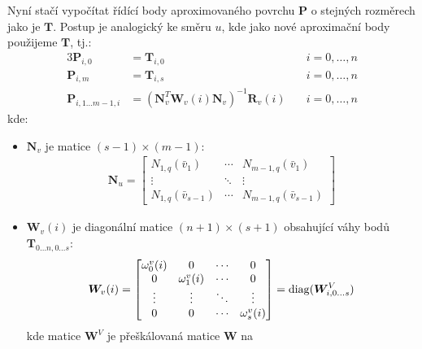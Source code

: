 Nyní stačí vypočítat řídící body aproximovaného povrchu $\bm{P}$ o stejných rozměrech
jako je $\bm{T}$.
Postup je analogický ke směru $u$, kde jako nové aproximační body použijeme
$\bm{T}$, tj.:
\begin{alignat}{3}
    \bm{P}_{i, 0}                 & = \bm{T}_{i, 0}                                   & \quad i = 0, \ldots, n \\
    \bm{P}_{i, m}                 & = \bm{T}_{i, s}                                   & \quad i = 0, \ldots, n \\
    \bm{P}_{i, 1 \ldots m - 1, i} & = (\bm{N}_v^T\bm{W}_v(i)\bm{N}_v)^{-1}\bm{R}_v(i) & \quad i = 0, \ldots, n
\end{alignat}
kde:
\begin{itemize}
    \item $\bm{N}_v$ je matice $(s - 1) \times (m - 1)$:
          \begin{align}
              \bm{N}_u =
              \begin{bmatrix}
                  N_{1,q}(\bar{v}_1)        & \cdots & N_{m-1,q}(\bar{v}_1)     \\
                  \vdots                    & \ddots & \vdots                   \\
                  N_{1, q}(\bar{v}_{s - 1}) & \cdots & N_{m-1,q}(\bar{v}_{s-1})
              \end{bmatrix}
          \end{align}
    \item $\bm{W}_v(i)$ je diagonální matice $(n + 1)\times(s + 1)$ obsahující váhy
          bodů $\bm{T}_{0\ldots n, 0\ldots s}$:
          \begin{align}
              \bm{W}_v(i)
              = \begin{bmatrix}
                    \omega^v_0(i) & 0             & \cdots & 0               \\
                    0             & \omega^v_1(i) & \cdots & 0               \\
                    \vdots        & \vdots        & \ddots & \vdots          \\
                    0             & 0             & \cdots & \omega^v_{s}(i)
                \end{bmatrix}
              = \operatorname{diag}(\bm{W}^V_{i, 0\ldots s})
          \end{align}
          kde matice $\bm{W}^V$ je přeškálovaná matice $\bm{W}$ na

\end{itemize}
